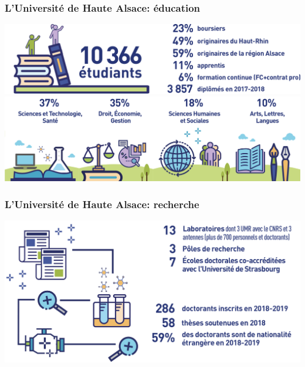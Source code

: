 \documentclass[11pt]{beamer}
\begin{document}
		\begin{frame}[t]
			\frametitle{L'Université de Haute Alsace: éducation}
			\centering
			\vspace{10pt}
			\includegraphics[width=\linewidth]{UHA_etudiants}
			\\\vspace{30pt}
			\includegraphics[width=\linewidth]{UHA_etudiants_repartition}
		\end{frame}
		\begin{frame}
			\frametitle{L'Université de Haute Alsace: recherche}
			\centering
			\vspace{10pt}
			\includegraphics[width=\linewidth]{UHA_recherche}
		\end{frame}
\end{document}
